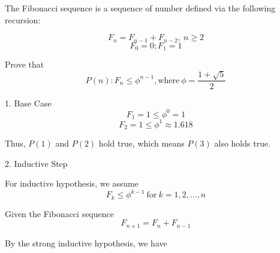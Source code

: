 \begin{eg}
  The Fibonacci sequence is a sequence of number defined via the following recursion: 
  
  \[
  F_n = F_{n-1} + F_{n-2},\ n \geq 2
  \]
  \[
    F_0 = 0; F_1 = 1
  \]
  
  Prove that \[
  P(n): F_n \leq \phi^{n-1}, \text{where}\ \phi = \dfrac{1 + \sqrt{5}}{2}
  \]

  1. Base Case
  \[
    F_1 = 1 \leq \phi^0 = 1
  \]
  \[
    F_2 = 1 \leq \phi^1 \approx 1.618
  \]

  Thus, \(P(1)\) and \(P(2)\) hold true, which means \(P(3)\) also holds true. 

  2. Inductive Step

  For inductive hypothesis, we assume \[F_k \leq \phi^{k-1}\ \text{for}\ k = 1, 2, \dots, n\]
  
  Given the Fibonacci sequence 
  \[
    F_{n+1} = F_n + F_{n-1}
  \]

  By the strong inductive hypothesis, we have 
  
\end{eg}

